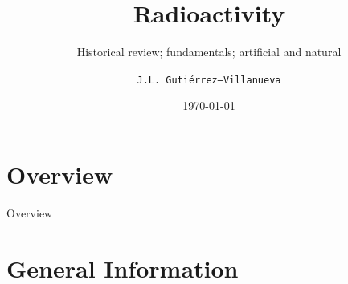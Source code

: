 \documentclass[newPxFont,numfooter,sectionpages]{beamer}
\title{Radioactivity}
\subtitle{Historical review; fundamentals; artificial and natural}
\date{\today}
\author{\texttt{J.L. Guti\'errez--Villanueva}}
\institute{LaRUC--Radon group \par U. Cantabria (Spain)}
\newcommand{\1}{\'{\i}}
\begin{document}
%
%

\maketitle



%
%

\section*{Overview}
\begin{frame}{Overview}
\tableofcontents[hideallsubsections]
\end{frame}

\section{General Information}

\end{document}
